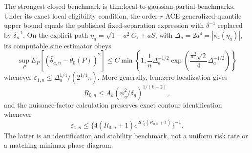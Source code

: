 The strongest closed benchmark is \(\text{thm:local-to-gaussian-partial-benchmarks}\).  Under its exact local eligibility condition, the order-\(r\) ACE generalized-quantile upper bound equals the published fixed-separation expression with \(\delta^{-1}\) replaced by \(\delta_n^{-1}\).  On the explicit path \(\eta_a=\sqrt{1-a^2}G_\circ+aS\), with \(\Delta_a=2a^4=|\kappa_4(\eta_a)|\), its computable sine estimator obeys
\[
 \sup_P E_P[(\widehat\theta_{a,n}-\theta_0(P))^2]
 \le C\min\!\left\{1,
  \frac1n\Delta_a^{-1/2}
  \exp\!\left(\frac{\pi^2\sqrt2}{4}\Delta_a^{-1/2}\right)
 \right\}
\]
whenever \(\varepsilon_{1,n}\le\Delta_a^{1/4}/(2^{1/4}\pi)\).  More generally, \(\text{lem:zero-localization}\) gives
\[
 R_{0,n}\le A_k(\psi_\eta^2/\delta_n)^{1/(k-2)},
\]
and the nuisance-factor calculation preserves exact contour identification whenever
\[
 \varepsilon_{1,n}
 \le\{4(R_{0,n}+1)e^{2C_g(R_{0,n}+1)}\}^{-1}.
\]
The latter is an identification and stability benchmark, not a uniform risk rate or a matching minimax phase diagram.